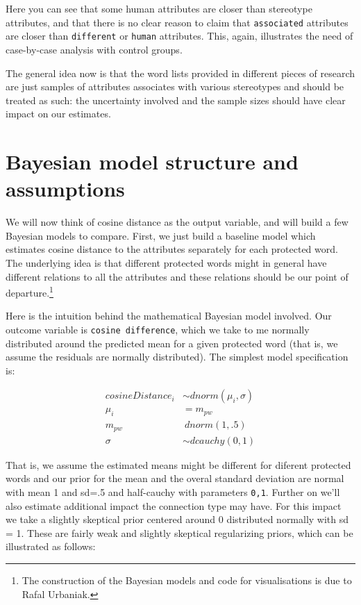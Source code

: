 \documentclass[12pt,]{book}
\begin{document}
\normalsize

\noindent Here you can see that some human attributes are closer than
stereotype attributes, and that there is no clear reason to claim that
\texttt{associated} attributes are closer than \texttt{different} or
\texttt{human} attributes. This, again, illustrates the need of
case-by-case analysis with control groups.

The general idea now is that the word lists provided in different pieces
of research are just samples of attributes associates with various
stereotypes and should be treated as such: the uncertainty involved and
the sample sizes should have clear impact on our estimates.

\section{Bayesian model structure and
assumptions}\label{bayesian-model-structure-and-assumptions}

We will now think of cosine distance as the output variable, and will
build a few Bayesian models to compare. First, we just build a baseline
model which estimates cosine distance to the attributes separately for
each protected word. The underlying idea is that different protected
words might in general have different relations to all the attributes
and these relations should be our point of departure.\footnote{The
  construction of the Bayesian models and code for visualisations is due
  to Rafal Urbaniak.}

Here is the intuition behind the mathematical Bayesian model involved.
Our outcome variable is \texttt{cosine\ difference}, which we take to me
normally distributed around the predicted mean for a given protected
word (that is, we assume the residuals are normally distributed). The
simplest model specification is:

\begin{align}
cosineDistance_i  & \sim dnorm(\mu_i, \sigma) \\
\mu_i & = m_{pw} \\
m_{pw} & ~ dnorm(1,.5) \\
\sigma &\sim  dcauchy(0,1)
\end{align}

That is, we assume the estimated means might be different for diferent
protected words and our prior for the mean and the overal standard
deviation are normal with mean 1 and sd=.5 and half-cauchy with
parameters \texttt{0,1}. Further on we'll also estimate additional
impact the connection type may have. For this impact we take a slightly
skeptical prior centered around 0 distributed normally with sd = 1.
These are fairly weak and slightly skeptical regularizing priors, which
can be illustrated as follows:
\end{document}
